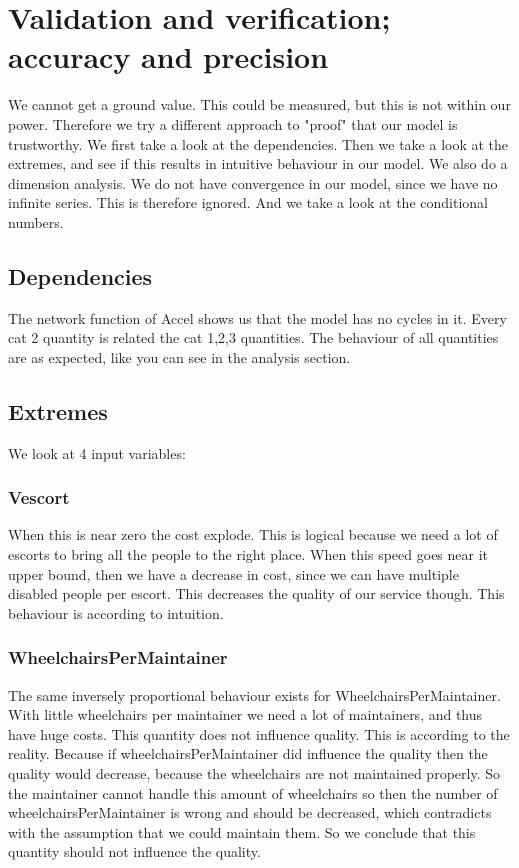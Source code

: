 \documentclass[a4paper, 11pt, notitlepage]{report}
\begin{document}
\chapter{Validation and verification; accuracy and precision}
We cannot get a ground value. This could be measured, but this is not within our power. Therefore we try a different approach to "proof" that our model is trustworthy. We first take a look at the dependencies. Then we take a look at the extremes, and see if this results in intuitive behaviour in our model. We also do a dimension analysis. We do not have convergence in our model, since we have no infinite series. This is therefore ignored. And we take a look at the conditional numbers.

\section{Dependencies} The network function of Accel shows us that the model has no cycles in it. Every cat 2 quantity is related the cat 1,2,3 quantities. The behaviour of all quantities are as expected, like you can see in the analysis section.

\section{Extremes} We look at 4 input variables:
	\subsection{Vescort} When this is near zero the cost explode. This is logical because we need a lot of escorts to bring all the people to the right place. When this speed goes near it upper bound, then we have a decrease in cost, since we can have multiple disabled people per escort. This decreases the quality of our service though. This behaviour is according to intuition.
	\subsection{WheelchairsPerMaintainer} The same inversely proportional behaviour exists for WheelchairsPerMaintainer. With little wheelchairs per maintainer we need a lot of maintainers, and thus have huge costs. This quantity does not influence quality. This is according to the reality. Because if wheelchairsPerMaintainer did influence the quality then the quality would decrease, because the wheelchairs are not maintained properly. So the maintainer cannot handle this amount of wheelchairs so then the number of wheelchairsPerMaintainer is wrong and should be decreased, which contradicts with the assumption that we could maintain them. So we conclude that this quantity should not influence the quality.
\end{document}

